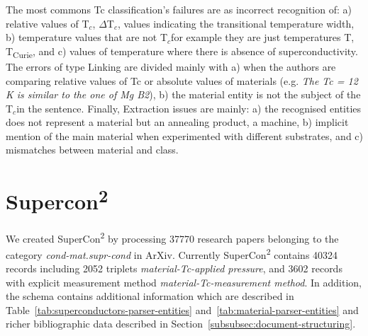 \documentclass{article}
\newcommand{\tc}{T$_{c}$}
\begin{document}
The most commons Tc classification's failures are as incorrect recognition of: a) relative values of \tc, $\Delta$\tc, values indicating the transitional temperature width,  b) temperature values that are not \tc for example they are just temperatures T, T\textsubscript{Curie}, and c) values of temperature where there is absence of superconductivity.
The errors of type Linking are divided mainly with a) when the authors are comparing relative values of Tc or absolute values of materials (e.g. \textit{The Tc = 12 K is similar to the one of Mg B2}), b) the material entity is not the subject of the \tc  in the sentence. 
Finally, Extraction issues are mainly: a) the recognised entities does not represent a material but an annealing product, a machine, b) implicit mention of the main material when experimented with different substrates, and c) mismatches between material and class. 



\section{Supercon\textsuperscript{2}}

We created SuperCon\textsuperscript{2} by processing 37770 research papers belonging to the category \textit{cond-mat.supr-cond} in ArXiv. 
Currently SuperCon\textsuperscript{2} contains 40324 records including 2052 triplets \textit{material-Tc-applied pressure}, and 3602 records with explicit measurement method \textit{material-Tc-measurement method}.
In addition, the schema contains additional information which are described in Table~\ref{tab:superconductors-parser-entities} and~\ref{tab:material-parser-entities} and richer bibliographic data described in Section~\ref{subsubsec:document-structuring}. 
\end{document}
